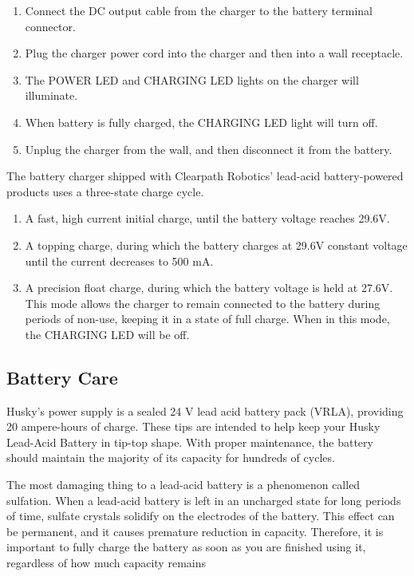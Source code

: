 \documentclass[]{clearpath-latex/clearpath-manual}
\begin{document}
\begin{enumerate}
	\item Connect the DC output cable from the charger to the battery terminal connector.
	\item Plug the charger power cord into the charger and then into a wall receptacle.
	\item The POWER LED and CHARGING LED lights on the charger will illuminate.
	\item When battery is fully charged, the CHARGING LED light will turn off. 
	\item Unplug the charger from the wall, and then disconnect it from the battery.
\end{enumerate}

The battery charger shipped with Clearpath Robotics’ lead-acid 
battery-powered products uses a three-state charge cycle.

\begin{enumerate}
		\item A fast, high current initial charge, until the battery voltage reaches 29.6V.
		\item A topping charge, during which the battery charges at 29.6V constant voltage 
		until the current decreases to 500 mA.
		\item A precision float charge, during which the battery voltage is held at 27.6V. 
		This mode allows the charger to remain connected to the battery during periods of non-use, 
		keeping it in a state of full charge. When in this mode, the CHARGING LED will be off.
\end{enumerate}		

\subsection{Battery Care}
Husky’s power supply is a sealed 24 V lead acid battery pack (VRLA), providing 20 ampere-hours of charge. These tips are 
intended to help keep your Husky Lead-Acid Battery in tip-top shape.  With proper maintenance, the battery should 
maintain the majority of its capacity for hundreds of cycles.

The most damaging thing to a lead-acid battery is a phenomenon called sulfation.  
When a lead-acid battery is left in an uncharged state for long periods of time, 
sulfate crystals solidify on the electrodes of the battery.  This effect can be permanent, 
and it causes premature reduction in capacity.  Therefore, it is important to fully charge 
the battery as soon as you are finished using it, regardless of how much capacity remains
\end{document}
